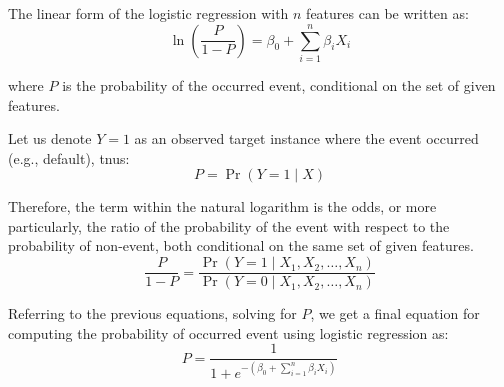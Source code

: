The linear form of the logistic regression with $n$ features can be written as:
\begin{equation}\label{eq}
    \ln\left(\frac{P}{1-P}\right) = \beta_0  + \sum_{i=1}^{n} \beta_i X_i
\end{equation}

where $P$ is the probability of the occurred event, conditional on the set of given features.

Let us denote $Y=1$ as an observed target instance where the event occurred (e.g., default), tnus:
\begin{equation}\label{eq}
    P = \operatorname{Pr}(Y=1 \mid X)
\end{equation}

Therefore, the term within the natural logarithm is the odds, or more particularly, the ratio of the probability of the event with respect to the probability of non-event, both conditional on the same set of given features.
\begin{equation}\label{eq}
    \frac{P}{1-P}  = \frac{\operatorname{Pr}(Y=1 \mid X_1,X_2,\ldots,X_n)}{\operatorname{Pr}(Y=0 \mid X_1,X_2,\ldots,X_n)}
\end{equation}

Referring to the previous equations, solving for $P$, we get a final equation for computing the probability of occurred event using logistic regression as:
\begin{equation}\label{eq}
P = \frac{1}{1+e^{-\left(\beta_0 + \sum_{i=1}^{n} \beta_i X_i\right)}}
\end{equation}

